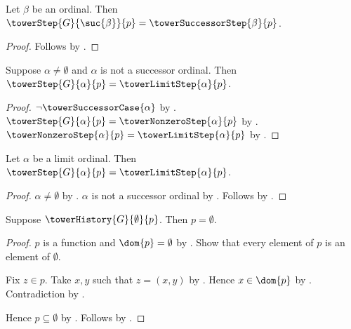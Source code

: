 \begin{corollary}\label{tower_step_successor}
    Let $\beta$ be an ordinal.
    Then $\towerStep{G}{\suc{\beta}}{p}=
        \towerSuccessorStep{\beta}{p}$.
\end{corollary}
\begin{proof}
    Follows by
        .
\end{proof}

\begin{proposition}\label{tower_step_nonzero_nonsuccessor}
    Suppose $\alpha\neq\emptyset$ and
        $\alpha$ is not a successor ordinal.
    Then $\towerStep{G}{\alpha}{p}=\towerLimitStep{\alpha}{p}$.
\end{proposition}
\begin{proof}
    $\lnot\towerSuccessorCase{\alpha}$ by
        .
    $\towerStep{G}{\alpha}{p}=\towerNonzeroStep{\alpha}{p}$ by
        .
    $\towerNonzeroStep{\alpha}{p}=\towerLimitStep{\alpha}{p}$ by
        .
\end{proof}

\begin{corollary}\label{tower_step_limit}
    Let $\alpha$ be a limit ordinal.
    Then $\towerStep{G}{\alpha}{p}=\towerLimitStep{\alpha}{p}$.
\end{corollary}
\begin{proof}
    $\alpha\neq\emptyset$ by
        .
    $\alpha$ is not a successor ordinal by
        .
    Follows by .
\end{proof}

\begin{proposition}\label{tower_empty_history_is_empty}
    Suppose $\towerHistory{G}{\emptyset}{p}$.
    Then $p=\emptyset$.
\end{proposition}
\begin{proof}
    $p$ is a function and $\dom{p}=\emptyset$ by
        .
    Show that every element of $p$ is an element of $\emptyset$.
    \begin{subproof}
        Fix $z\in p$.
        Take $x,y$ such that $z=(x,y)$ by .
        Hence $x\in\dom{p}$ by .
        Contradiction by .
    \end{subproof}
    Hence $p\subseteq\emptyset$ by .
    Follows by .
\end{proof}

